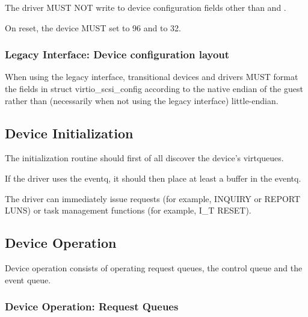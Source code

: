 The driver MUST NOT write to device configuration fields other than
 and .


On reset, the device MUST set  to 96 and
 to 32.

\subsubsection{Legacy Interface: Device configuration layout}\label{sec:Device Types / SCSI Host Device / Device configuration layout / Legacy Interface: Device configuration layout}
When using the legacy interface, transitional devices and drivers
MUST format the fields in struct virtio_scsi_config
according to the native endian of the guest rather than
(necessarily when not using the legacy interface) little-endian.

\subsection{Device Initialization}\label{sec:Device Types / SCSI Host Device / Device Initialization}

The initialization routine should first of all discover the
device's virtqueues.

If the driver uses the eventq, it should then place at least a
buffer in the eventq.

The driver can immediately issue requests (for example, INQUIRY
or REPORT LUNS) or task management functions (for example, I_T
RESET).

\subsection{Device Operation}\label{sec:Device Types / SCSI Host Device / Device Operation}

Device operation consists of operating request queues, the control
queue and the event queue.

\subsubsection{Device Operation: Request Queues}\label{sec:Device Types / SCSI Host Device / Device Operation / Device Operation: Request Queues}

